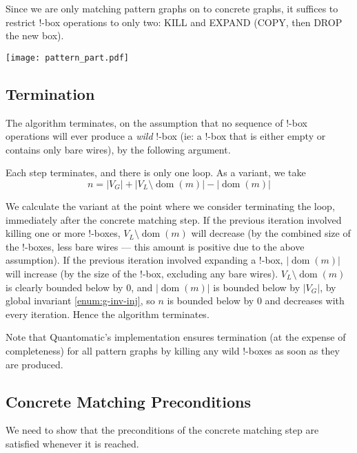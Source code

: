 \documentclass{article}
\DeclareMathOperator{\dom}{dom}
\begin{document}
Since we are only matching pattern graphs on to concrete graphs, it suffices to restrict $!$-box operations to only two: KILL and EXPAND (COPY, then DROP the new box).

\begin{center}
  \texttt{[image: pattern\_part.pdf]}
\end{center}


\subsection{Termination}

The algorithm terminates, on the assumption that no sequence of $!$-box operations will ever produce a \textit{wild} $!$-box (ie: a $!$-box that is either empty or contains only bare wires), by the following argument.

Each step terminates, and there is only one loop.  As a variant, we take
\[ n = |V_G| + |V_L\setminus\dom(m)| - |\dom(m)| \]

We calculate the variant at the point where we consider terminating the loop, immediately after the concrete matching step.  If the previous iteration involved killing one or more $!$-boxes, $V_L\setminus\dom(m)$ will decrease (by the combined size of the $!$-boxes, less bare wires --- this amount is positive due to the above assumption).  If the previous iteration involved expanding a $!$-box, $|\dom(m)|$ will increase (by the size of the $!$-box, excluding any bare wires).  $V_L\setminus\dom(m)$ is clearly bounded below by $0$, and $|\dom(m)|$ is bounded below by $|V_G|$, by global invariant \ref{enum:g-inv-inj}, so $n$ is bounded below by $0$ and decreases with every iteration.  Hence the algorithm terminates.

Note that Quantomatic's implementation ensures termination (at the expense of completeness) for all pattern graphs by killing any wild $!$-boxes as soon as they are produced.


\subsection{Concrete Matching Preconditions}

We need to show that the preconditions of the concrete matching step are satisfied whenever it is reached.
\end{document}
